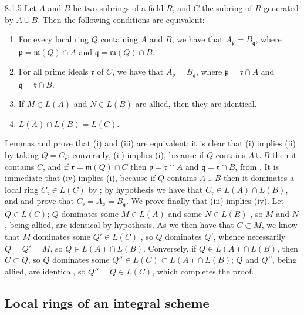 \begin{envs}[Proposition]{8.1.5}
\label{prop-1.8.1.5}
Let $A$ and $B$ be two subrings of a field $R$,
and $C$ the subring of $R$ generated by $A\cup B$. Then the following
conditions are equivalent:
\begin{enumerate}[label=\rm{(\roman*)}]
  \item For every local ring $Q$ containing $A$ and $B$, we have that
        $A_\mathfrak{p}=B_\mathfrak{q}$, where $\mathfrak{p}=\mathfrak{m}(Q)\cap A$ and
        $\mathfrak{q}=\mathfrak{m}(Q)\cap B$.
  \item For all prime ideals $\mathfrak{r}$ of $C$, we have that
        $A_\mathfrak{p}=B_\mathfrak{q}$, where $\mathfrak{p}=\mathfrak{r}\cap A$ and
        $\mathfrak{q}=\mathfrak{r}\cap B$.
  \item If $M\in L(A)$ and $N\in L(B)$ are allied, then they are identical.
  \item $L(A)\cap L(B)=L(C)$.
\end{enumerate}
\end{envs}

Lemmas  and  prove that (i) and (iii) are equivalent; it
is clear that (i) implies (ii) by taking $Q=C_\mathfrak{r}$; conversely, (ii)
implies (i), because if $Q$ contains $A\cup B$ then it contains $C$, and if
$\mathfrak{r}=\mathfrak{m}(Q)\cap C$ then $\mathfrak{p}=\mathfrak{r}\cap A$ and
$\mathfrak{q}=\mathfrak{r}\cap B$, from . It is immediate that (iv)
implies (i), because if $Q$ contains $A\cup B$ then it dominates a local ring
$C_\mathfrak{r}\in L(C)$ by ; by hypothesis we have that
$C_\mathfrak{r}\in L(A)\cap L(B)$, and  and  prove that
$C_\mathfrak{r}=A_\mathfrak{p}=B_\mathfrak{q}$. We prove finally that (iii)
implies (iv). Let $Q\in L(C)$; $Q$ dominates some $M\in L(A)$ and some $N\in
L(B)$ , so $M$ and $N$, being allied, are identical by hypothesis.
As we then have that $C\subset M$, we know that $M$ dominates some $Q'\in L(C)$
, so $Q$ dominates $Q'$, whence necessarily  $Q=Q'=M$,
so $Q\in L(A)\cap L(B)$. Conversely, if $Q\in L(A)\cap L(B)$, then $C\subset
Q$, so  $Q$ dominates some $Q''\in L(C)\subset L(A)\cap L(B)$; $Q$
and $Q''$, being allied, are identical, so $Q''=Q\in L(C)$, which completes the
proof.

\subsection{Local rings of an integral scheme}
\label{1-schemes-8.2}

